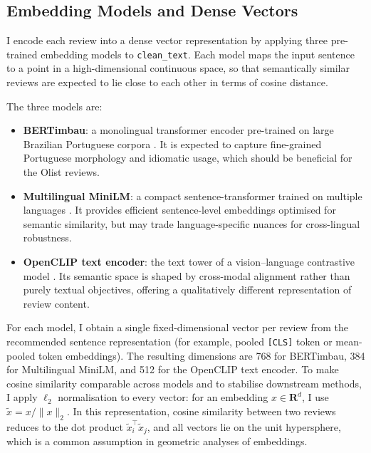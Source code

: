 \documentclass[a4paper,11pt]{article}
\begin{document}
\subsection{Embedding Models and Dense Vectors}
\label{subsec:embeddings}

I encode each review into a dense vector representation by applying three pre-trained embedding models to \texttt{clean\_text}. 
Each model maps the input sentence to a point in a high-dimensional continuous space, so that semantically similar reviews are expected to lie close to each other in terms of cosine distance.

The three models are:

\begin{itemize}
    \item \textbf{BERTimbau}: a monolingual transformer encoder pre-trained on large Brazilian Portuguese corpora \citep{bertimbau-paper}. It is expected to capture fine-grained Portuguese morphology and idiomatic usage, which should be beneficial for the Olist reviews.
    \item \textbf{Multilingual MiniLM}: a compact sentence-transformer trained on multiple languages \citep{minilm-paper,reimers-gurevych-sbert}. It provides efficient sentence-level embeddings optimised for semantic similarity, but may trade language-specific nuances for cross-lingual robustness.
    \item \textbf{OpenCLIP text encoder}: the text tower of a vision--language contrastive model \citep{clip-paper,openclip-paper}. Its semantic space is shaped by cross-modal alignment rather than purely textual objectives, offering a qualitatively different representation of review content.
\end{itemize}

For each model, I obtain a single fixed-dimensional vector per review from the recommended sentence representation (for example, pooled \texttt{[CLS]} token or mean-pooled token embeddings). 
The resulting dimensions are 768 for BERTimbau, 384 for Multilingual MiniLM, and 512 for the OpenCLIP text encoder. 
To make cosine similarity comparable across models and to stabilise downstream methods, I apply $\ell_2$ normalisation to every vector: for an embedding $x \in \mathbf{R}^d$, I use $\tilde{x} = x / \|x\|_2$. 
In this representation, cosine similarity between two reviews reduces to the dot product $\tilde{x}_i^\top \tilde{x}_j$, and all vectors lie on the unit hypersphere, which is a common assumption in geometric analyses of embeddings.
\end{document}
